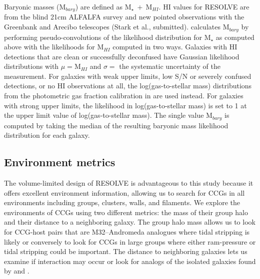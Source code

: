 \documentclass[iop,apj]{emulateapj}
\begin{document}
Baryonic masses ($\text{M}_{bary}$) are defined as $\text{M}_{\star}~+~\text{M}_{HI}$. HI values for RESOLVE are from the blind 21cm ALFALFA survey \citep{Haynes2011} and new pointed observations with the Greenbank and Arecibo telescopes (Stark et al., submitted). \citet{Eckert2016} calculates $\text{M}_{bary}$ by performing pseudo-convolutions of the likelihood distribution for $\text{M}_{\star}$ as computed above with the likelihoods for $\text{M}_{HI}$ computed in two ways. Galaxies with HI detections that are clean or successfully deconfused have Gaussian likelihood distributions with $\mu =  \text{M}_{HI}$ and $\sigma = $ the systematic uncertainty of the measurement. For galaxies with weak upper limits, low S/N or severely confused detections, or no HI observations at all, the log(gas-to-stellar mass) distributions from the photometric gas fraction calibration in \citet{Eckert2015} are used instead. For galaxies with strong upper limits, the likelihood in log(gas-to-stellar mass) is set to 1 at the upper limit value of
log(gas-to-stellar mass). The single value $\text{M}_{bary}$ is computed by taking the median of the resulting baryonic mass likelihood distribution for each galaxy.


\subsection{Environment metrics}
\label{env}
The volume-limited design of RESOLVE is advantageous to this study because it offers excellent environment information, allowing us to search for CCGs in all environments including groups, clusters, walls, and filaments. We explore the environments of CCGs using two different metrics: the mass of their group halo and their distance to a neighboring galaxy. The group halo mass allows us to look for CCG-host pairs that are M32--Andromeda analogues where tidal stripping is likely or conversely to look for CCGs in large groups where either ram-pressure or tidal stripping could be important. The distance to neighboring galaxies lets us examine if interaction may occur or look for analogs of the isolated galaxies found by \citet{Huxor2013} and \citet{Paudel2014}.
\end{document}
